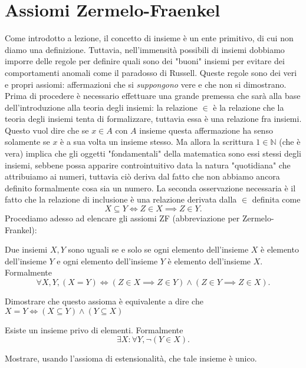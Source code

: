 \documentclass[12pt, twoside, italian, openany]{book}
\begin{document}
    \chapter{Assiomi Zermelo-Fraenkel}
    Come introdotto a lezione, il concetto di insieme è un ente primitivo, di cui non diamo una definizione. Tuttavia, nell'immensità possibili di insiemi dobbiamo imporre delle regole per definire quali sono dei "buoni" insiemi
    per evitare dei comportamenti anomali come il paradosso di Russell. Queste regole sono dei veri e propri assiomi: affermazioni che si \emph{suppongono} vere e che non si dimostrano. Prima di procedere è necessario effettuare una grande premessa
    che sarà alla base dell'introduzione alla teoria degli insiemi: la relazione $\in$ è la relazione che la teoria degli insiemi tenta di formalizzare, tuttavia essa è una relazione fra insiemi. Questo vuol dire che se $x \in A$ con $A$ insieme questa affermazione
    ha senso solamente se $x$ è a sua volta un insieme stesso. Ma allora la scrittura $1 \in \mathbb{N}$ (che è vera) implica che gli oggetti "fondamentali" della matematica sono essi stessi degli insiemi, sebbene possa apparire controintuitivo data la natura "quotidiana" che attribuiamo ai numeri, tuttavia ciò deriva dal fatto che non abbiamo ancora
    definito formalmente cosa sia un numero. La seconda osservazione necessaria è il fatto che la relazione di inclusione è una relazione derivata dalla $ \in$ definita come
    $$
        X \subseteq Y \iff Z \in X \implies Z \in Y.
    $$
    Procediamo adesso ad elencare gli assiomi ZF (abbreviazione per Zermelo-Frankel):
    \begin{axiom}
        Due insiemi $X, Y$ sono uguali se e solo se ogni elemento dell'insieme $X$ è elemento dell'insieme $Y$ e ogni elemento dell'insieme $Y$ è elemento dell'insieme $X$. Formalmente
        $$
        \forall X, Y, (X = Y) \iff (Z \in X \implies Z \in Y) \wedge (Z \in Y \implies Z \in X).
        $$
    \end{axiom}
    \begin{exercise}
        Dimostrare che questo assioma è equivalente a dire che $X = Y \iff (X \subseteq Y) \wedge (Y \subseteq X)$
    \end{exercise}
    \begin{axiom}
        Esiste un insieme privo di elementi. Formalmente
        $$
        \exists X : \forall Y, \neg (Y \in X).
        $$
    \end{axiom}
    \begin{exercise}
        Mostrare, usando l'assioma di estensionalità, che tale insieme è unico.
    \end{exercise}
\end{document}
